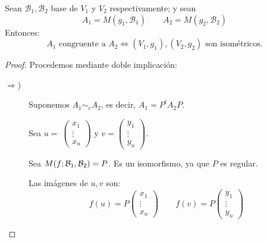\begin{prop}
    Sean $\mathcal{B}_1,\mathcal{B}_2$ base de $V_1$ y $V_2$ respectivamente; y sean
    \begin{equation*}
        A_1 = M(g_1, \mathcal{B}_1) \qquad A_2 = M(g_2, \mathcal{B}_2)
    \end{equation*}
    Entonces:
    \begin{equation*}
        A_1 \text{ congruente a } A_2 \Longleftrightarrow (V_1,g_1),(V_2,g_2) \text{ son isométricos}.
    \end{equation*}
\end{prop}
\begin{proof} Procedemos mediante doble implicación:
\begin{description}
    \item [$\Longrightarrow$)]
    Suponemos $A_1\sim_c A_2$, es decir, $A_1=P^tA_2P$.
    
    Sea $u=~\left(\begin{array}{c}
        x_1 \\ \vdots \\ x_n
    \end{array}\right)$ y $v=\left(\begin{array}{c}
        y_1 \\ \vdots \\ y_n
    \end{array}\right)$.

    Sea $M(f;\mathcal{B}_1, \mathcal{B}_2) = P$. Es un isomorfismo, ya que $P$ es regular.

    Las imágenes de $u,v$ son:
    \begin{equation*}
        f(u) = P\left(\begin{array}{c}
            x_1 \\ \vdots \\ x_n
        \end{array}\right)
        \qquad
        f(v) = P\left(\begin{array}{c}
            y_1 \\ \vdots \\ y_n
        \end{array}\right)
    \end{equation*}


\end{description}
\end{proof}
